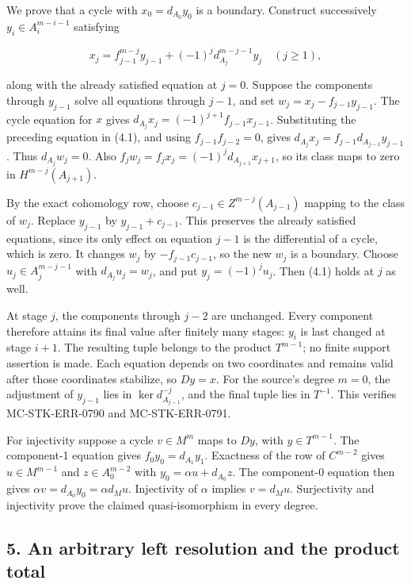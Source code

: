 \documentclass[11pt]{article}
\begin{document}
We prove that a cycle with \(x_0=d_{A_0}y_0\) is a boundary. Construct successively \(y_i\in A_i^{m-i-1}\) satisfying

\[
x_j=f_{j-1}^{m-j}y_{j-1}+(-1)^j d_{A_j}^{m-j-1}y_j
\quad (j\geq1),                             \tag{4.1}
\]

along with the already satisfied equation at \(j=0\). Suppose the components through \(y_{j-1}\) solve all equations through \(j-1\), and set \(w_j=x_j-f_{j-1}y_{j-1}\). The cycle equation for \(x\) gives \(d_{A_j}x_j=(-1)^{j+1}f_{j-1}x_{j-1}\). Substituting the preceding equation in (4.1), and using \(f_{j-1}f_{j-2}=0\), gives \(d_{A_j}x_j=f_{j-1}d_{A_{j-1}}y_{j-1}\). Thus \(d_{A_j}w_j=0\). Also \(f_jw_j=f_jx_j=(-1)^j d_{A_{j+1}}x_{j+1}\), so its class maps to zero in \(H^{m-j}(A_{j+1})\).

By the exact cohomology row, choose \(c_{j-1}\in Z^{m-j}(A_{j-1})\) mapping to the class of \(w_j\). Replace \(y_{j-1}\) by \(y_{j-1}+c_{j-1}\). This preserves the already satisfied equations, since its only effect on equation \(j-1\) is the differential of a cycle, which is zero. It changes \(w_j\) by \(-f_{j-1}c_{j-1}\), so the new \(w_j\) is a boundary. Choose \(u_j\in A_j^{m-j-1}\) with \(d_{A_j}u_j=w_j\), and put \(y_j=(-1)^j u_j\). Then (4.1) holds at \(j\) as well.

At stage \(j\), the components through \(j-2\) are unchanged. Every component therefore attains its final value after finitely many stages: \(y_i\) is last changed at stage \(i+1\). The resulting tuple belongs to the product \(T^{m-1}\); no finite support assertion is made. Each equation depends on two coordinates and remains valid after those coordinates stabilize, so \(Dy=x\). For the source's degree \(m=0\), the adjustment of \(y_{j-1}\) lies in \(\ker d^{-j}_{A_{j-1}}\), and the final tuple lies in \(T^{-1}\). This verifies MC-STK-ERR-0790 and MC-STK-ERR-0791.

For injectivity suppose a cycle \(v\in M^m\) maps to \(Dy\), with \(y\in T^{m-1}\). The component-1 equation gives \(f_0y_0=d_{A_1}y_1\). Exactness of the row of \(C^{m-2}\) gives \(u\in M^{m-1}\) and \(z\in A_0^{m-2}\) with \(y_0=\alpha u+d_{A_0}z\). The component-0 equation then gives \(\alpha v=d_{A_0}y_0=\alpha d_Mu\). Injectivity of \(\alpha\) implies \(v=d_Mu\). Surjectivity and injectivity prove the claimed quasi-isomorphism in every degree.

\subsection{5. An arbitrary left resolution and the product total}\label{note-08-an-arbitrary-left-resolution-and-the-product-total}
\end{document}
